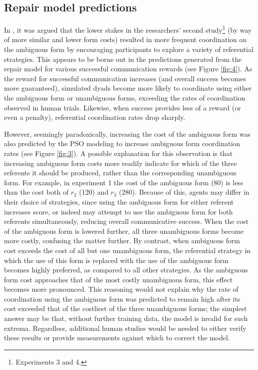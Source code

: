 \documentclass[12pt,a4paper]{article}
\begin{document}
\subsection{Repair model predictions}
In \citeauthor{rohde2012}, it was argued that the lower stakes in the researchers' second study\footnote{Experiments 3 and 4.} (by way of more similar and lower form costs) resulted in more frequent coordination on the ambiguous form by encouraging participants to explore a variety of referential strategies. This appears to be borne out in the predictions generated from the repair model for various successful communication rewards (see Figure \ref{fig:4}). As the reward for successful communication increases (and overall success becomes more guaranteed), simulated dyads become more likely to coordinate using either the ambiguous form or unambiguous forms, exceeding the rates of coordination observed in human trials. Likewise, when success provides less of a reward (or even a penalty), referential coordination rates drop sharply. 

However, seemingly paradoxically, increasing the cost of the ambiguous form was also predicted by the PSO modeling to increase ambiguous form coordination rates (see Figure \ref{fig:3}). A possible explanation for this observation is that increasing ambiguous form costs more readily indicate for which of the three referents it should be produced, rather than the corresponding unambiguous form. For example, in experiment 1 the cost of the ambiguous form (80) is less than the cost both of $r_2$ (120) and $r_3$ (280). Because of this, agents may differ in their choice of strategies, since using the ambiguous form for either referent increases score, or indeed may attempt to use the ambiguous form for both referents simultaneously, reducing overall communicative success. When the cost of the ambiguous form is lowered further, all three unambiguous forms become more costly, confusing the matter further. By contrast, when ambiguous form cost exceeds the cost of all but one unambiguous form, the referential strategy in which the use of this form is replaced with the use of the ambiguous form becomes highly preferred, as compared to all other strategies. As the ambiguous form cost approaches that of the most costly unambiguous form, this effect becomes more pronounced. This reasoning would not explain why the rate of coordination using the ambiguous form was predicted to remain high after its cost exceeded that of the costliest of the three unambiguous forms; the simplest answer may be that, without further training data, the model is invalid for such extrema. Regardless, additional human studies would be needed to either verify these results or provide measurements against which to correct the model.
\end{document}
